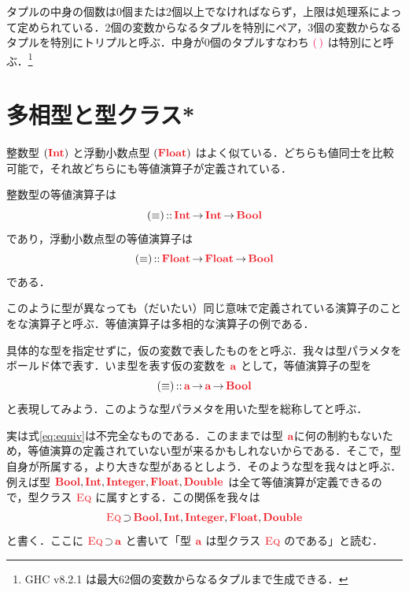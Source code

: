 \documentclass[a5paper,twoside,fleqn,draft]{jsbook}
\begin{document}
\separator

タプルの中身の個数は0個または2個以上でなければならず，上限は処理系によって定められている．2個の変数からなるタプルを特別にペア，3個の変数からなるタプルを特別にトリプルと呼ぶ．中身が0個のタプルすなわち $\hUnit$ は特別にと呼ぶ．\footnote{GHC v8.2.1 は最大62個の変数からなるタプルまで生成できる．}

\section{多相型と型クラス*}

整数型 $(\hInt)$ と浮動小数点型 $(\hFloat)$ はよく似ている．どちらも値同士を比較可能で，それ故どちらにも等値演算子が定義されている．

整数型の等値演算子は
\begin{equation}
  (\hIfEq)
  \hIsTypeOf\hInt\hFunctionArrow\hInt\hFunctionArrow\hBool
\end{equation}
であり，浮動小数点型の等値演算子は
\begin{equation}
  (\hIfEq)
  \hIsTypeOf\hFloat\hFunctionArrow\hFloat\hFunctionArrow\hBool
\end{equation}
である．

このように型が異なっても（だいたい）同じ意味で定義されている演算子のことをな演算子と呼ぶ．等値演算子は多相的な演算子の例である．

具体的な型を指定せずに，仮の変数で表したものをと呼ぶ．我々は型パラメタをボールド体で表す．いま型を表す仮の変数を $\hTypeName{a}$ として，等値演算子の型を
\begin{equation}
  \label{eq:equiv}
  (\hIfEq)
  \hIsTypeOf\hTypeName{a}\hFunctionArrow\hTypeName{a}\hFunctionArrow\hBool
\end{equation}
と表現してみよう．このような型パラメタを用いた型を総称してと呼ぶ．

実は式\eqref{eq:equiv}は不完全なものである．このままでは型 $\hTypeName{a}$に何の制約もないため，等値演算の定義されていない型が来るかもしれないからである．そこで，型自身が所属する，より大きな型があるとしよう．そのような型を我々はと呼ぶ．例えば型 $\hBool,\hInt,\hInteger,\hFloat,\hDouble$ は全て等値演算が定義できるので，型クラス $\hEq$ に属すとする．この関係を我々は
\begin{equation}
  \hEq
  \hHasElementsOf\hBool,\hInt,\hInteger,\hFloat,\hDouble
\end{equation}
と書く．ここに $\hEq\hHasElementsOf\hTypeName{a}$ と書いて「型 $\hTypeName{a}$ は型クラス $\hEq$ のである」と読む．
\end{document}
